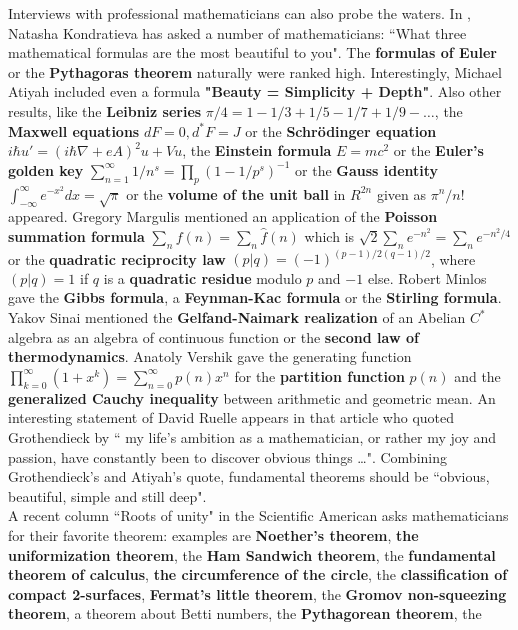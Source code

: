 \documentclass[12pt]{amsart}
\newcounter{example}    \def\example#1{ \item \fontsize{12}{15} \selectfont #1 \fontsize{12}{15} \selectfont }
\begin{document}
Interviews with professional mathematicians can also probe the waters.  In \cite{Kondratieva},
Natasha Kondratieva has asked a number of mathematicians: ``What three mathematical
formulas are the most beautiful to you". The {\bf formulas of Euler} or the {\bf Pythagoras 
theorem} naturally were ranked high. Interestingly, Michael Atiyah included even a formula 
{\bf "Beauty = Simplicity + Depth"}. Also other results, like the 
{\bf Leibniz series} $\pi/4 = 1-1/3+1/5-1/7+1/9 - \dots$, the {\bf Maxwell equations} 
$dF=0,d^*F=J$ or the {\bf Schr\"odinger equation} 
$i \hbar u'=(i \hbar \nabla + e A)^2 u + V u$, the {\bf Einstein formula} $E=mc^2$ or the
{\bf Euler's golden key} $\sum_{n=1}^{\infty} 1/n^s = \prod_p (1-1/p^s)^{-1}$  
or the {\bf Gauss identity} $\int_{-\infty} ^{\infty} e^{-x^2} dx = \sqrt{\pi}$ or
the {\bf volume of the unit ball} in $R^{2n}$ given as $\pi^n/n!$ appeared.
Gregory Margulis mentioned an application of the {\bf Poisson summation formula}  
$\sum_n f(n) = \sum_n \hat{f}(n)$
which is $\sqrt{2} \sum_n e^{-n^2} = \sum_n e^{-n^2/4}$
or the {\bf quadratic reciprocity law} $(p|q) = (-1)^{(p-1)/2 (q-1)/2}$, where
$(p|q)=1$ if $q$ is a {\bf quadratic residue} modulo $p$ and $-1$ else. 
Robert Minlos gave the {\bf Gibbs formula}, a {\bf Feynman-Kac formula} or the {\bf Stirling formula}.
Yakov Sinai mentioned the {\bf Gelfand-Naimark realization} of an Abelian $C^*$ algebra as an 
algebra of continuous function or the {\bf second law of thermodynamics}.
Anatoly Vershik gave the generating function $\prod_{k=0}^{\infty} (1+x^k) = \sum_{n=0}^{\infty} p(n) x^n$ 
for the {\bf partition function} $p(n)$ and the {\bf generalized Cauchy inequality} 
between arithmetic and geometric mean. 
An interesting statement of David Ruelle appears in that article who quoted Grothendieck
by `` my life's ambition as a mathematician, or rather my joy and passion, have constantly been 
to discover obvious things \dots". Combining Grothendieck's and Atiyah's quote, 
fundamental theorems should be ``obvious, beautiful, simple and still deep". \\
A recent column ``Roots of unity" in the Scientific American asks mathematicians for their
favorite theorem: examples are {\bf Noether's theorem}, {\bf the uniformization theorem},
the {\bf Ham Sandwich theorem}, the {\bf fundamental theorem of calculus}, {\bf the circumference of the circle},
the {\bf  classification of compact 2-surfaces}, {\bf Fermat's little theorem}, the 
{\bf Gromov non-squeezing theorem}, a theorem about Betti numbers, the {\bf Pythagorean theorem}, the 
\end{document}
